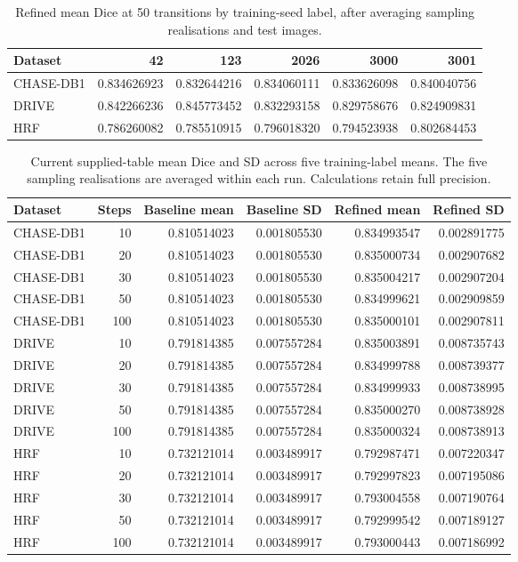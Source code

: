 \documentclass[jimaging,article,submit,pdftex,moreauthors]
  {Definitions/mdpi}
\begin{document}
\begin{table}[htbp]
\centering
\caption{Refined mean Dice at 50 transitions by training-seed label, after averaging sampling realisations and test images.}
\label{tab:paired_five_seed_means}
\scriptsize
\begin{tabular}{lrrrrr}
\toprule
Dataset & 42 & 123 & 2026 & 3000 & 3001 \\
\midrule
CHASE-DB1 & 0.834626923 & 0.832644216 & 0.834060111 & 0.833626098 & 0.840040756 \\
DRIVE & 0.842266236 & 0.845773452 & 0.832293158 & 0.829758676 & 0.824909831 \\
HRF & 0.786260082 & 0.785510915 & 0.796018320 & 0.794523938 & 0.802684453 \\
\bottomrule
\end{tabular}
\end{table}
\begin{table}[htbp]
\centering
\caption{Current supplied-table mean Dice and SD across five training-label means. The five sampling realisations are averaged within each run. Calculations retain full precision.}
\label{tab:uploaded_step_mean_sd}
\scriptsize
\begin{tabular}{lrrrrr}
\toprule
Dataset & Steps & Baseline mean & Baseline SD & Refined mean & Refined SD \\
\midrule
CHASE-DB1 & 10 & 0.810514023 & 0.001805530 & 0.834993547 & 0.002891775 \\
CHASE-DB1 & 20 & 0.810514023 & 0.001805530 & 0.835000734 & 0.002907682 \\
CHASE-DB1 & 30 & 0.810514023 & 0.001805530 & 0.835004217 & 0.002907204 \\
CHASE-DB1 & 50 & 0.810514023 & 0.001805530 & 0.834999621 & 0.002909859 \\
CHASE-DB1 & 100 & 0.810514023 & 0.001805530 & 0.835000101 & 0.002907811 \\
DRIVE & 10 & 0.791814385 & 0.007557284 & 0.835003891 & 0.008735743 \\
DRIVE & 20 & 0.791814385 & 0.007557284 & 0.834999788 & 0.008739377 \\
DRIVE & 30 & 0.791814385 & 0.007557284 & 0.834999933 & 0.008738995 \\
DRIVE & 50 & 0.791814385 & 0.007557284 & 0.835000270 & 0.008738928 \\
DRIVE & 100 & 0.791814385 & 0.007557284 & 0.835000324 & 0.008738913 \\
HRF & 10 & 0.732121014 & 0.003489917 & 0.792987471 & 0.007220347 \\
HRF & 20 & 0.732121014 & 0.003489917 & 0.792997823 & 0.007195086 \\
HRF & 30 & 0.732121014 & 0.003489917 & 0.793004558 & 0.007190764 \\
HRF & 50 & 0.732121014 & 0.003489917 & 0.792999542 & 0.007189127 \\
HRF & 100 & 0.732121014 & 0.003489917 & 0.793000443 & 0.007186992 \\
\bottomrule
\end{tabular}
\end{table}
\end{document}
